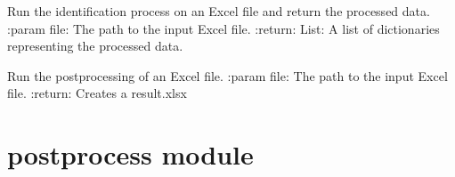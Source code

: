 \documentclass[letterpaper,10pt,english]{sphinxmanual}
\begin{document}

\begin{fulllineitems}
\label{\detokenize{main:main.run_identify}}
\pysigstartsignatures
{}
\pysigstopsignatures
\sphinxAtStartPar
Run the identification process on an Excel file and return the processed data.
:param file: The path to the input Excel file.
:return: List: A list of dictionaries representing the processed data.

\end{fulllineitems}


\begin{fulllineitems}
\label{\detokenize{main:main.run_postprocess}}
\pysigstartsignatures
{}
\pysigstopsignatures
\sphinxAtStartPar
Run the post\sphinxhyphen{}processing of an Excel file.
:param file: The path to the input Excel file.
:return: Creates a result.xlsx

\end{fulllineitems}


\sphinxstepscope


\section{postprocess module}
\label{\detokenize{postprocess:module-postprocess}}\label{\detokenize{postprocess:postprocess-module}}\label{\detokenize{postprocess::doc}}
\end{document}
